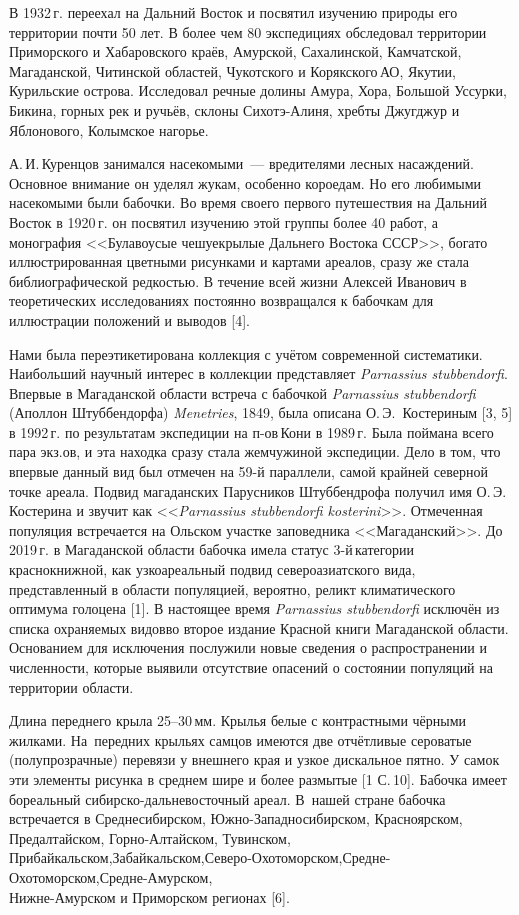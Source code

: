 В 1932\,г. переехал на Дальний Восток и посвятил изучению природы его территории почти 50 лет. В более чем 80 экспедициях обследовал территории Приморского и Хабаровского краёв, Амурской, Сахалинской, Камчатской, Магаданской, Читинской областей, Чукотского и Корякского\,АО, Якутии, Курильские острова. Исследовал речные долины Амура, Хора, Большой Уссурки, Бикина, горных рек и ручьёв, склоны Сихотэ-Алиня, хребты Джугджур и Яблонового, Колымское нагорье.

А.\,И.\,Куренцов занимался насекомыми~--- вредителями лесных насаждений. Основное внимание он уделял жукам, особенно короедам. Но его любимыми насекомыми были бабочки. Во время своего первого путешествия на Дальний Восток в 1920\,г. он посвятил изучению этой группы более 40 работ, а монография <<Булавоусые чешуекрылые Дальнего Востока СССР>>, богато иллюстрированная цветными рисунками и картами ареалов, сразу же стала библиографической редкостью. В течение всей жизни Алексей Иванович в теоретических исследованиях постоянно возвращался к бабочкам для иллюстрации положений и выводов [4].
\enlargethispage{\baselineskip}

Нами была переэтикетирована коллекция с учётом современной систематики. Наибольший научный интерес в коллекции представляет \textit{Parnassius stubbendorfi}. Впервые в Магаданской области встреча с бабочкой \textit{Parnassius stubbendorfi} (Аполлон Штуббендорфа) \textit{Menetries}, 1849, была описана О.\,Э.~Костериным [3, 5] в 1992\,г. по результатам экспедиции на п-ов\,Кони в 1989\,г. Была поймана всего пара экз.ов, и эта находка сразу стала жемчужиной экспедиции. Дело в том, что впервые данный вид был отмечен на 59-й параллели, самой крайней северной точке ареала. Подвид магаданских Парусников Штуббендрофа получил имя О.\,Э.\,Костерина и звучит как <<\textit{Parnassius stubbendorfi kosterini}>>. Отмеченная популяция встречается на Ольском участке заповедника <<Магаданский>>. До 2019\,г. в Магаданской области бабочка имела статус 3-й\,категории краснокнижной, как узкоареальный подвид североазиатского вида, представленный в области популяцией, вероятно, реликт климатического оптимума голоцена [1]. В настоящее время \textit{Parnassius stubbendorfi} исключён из списка охраняемых видов во второе издание Красной книги Магаданской области.\\Основанием для исключения послужили новые сведения о распространении и численности, которые выявили отсутствие опасений о состоянии популяций на территории области.

Длина переднего крыла 25--30\,мм. Крылья белые с контрастными чёрными жилками. На~передних крыльях самцов имеются две отчётливые сероватые (полупрозрачные) перевязи у внешнего края и узкое дискальное пятно. У самок эти элементы рисунка в среднем шире и более размытые [1 С.\,10]. Бабочка имеет бореальный сибирско-дальневосточный ареал. В~нашей стране бабочка встречается в Среднесибирском, Южно-Западносибирском, Красноярском, Предалтайском, Горно-Алтайском, Тувинском, Прибайкальском,\;\;Забайкальском,\;\;Северо-Охо\-то\-морс\-ком,\;\;\;Средне-Охотоморском,\;\;\;Средне-Амурском,\\Нижне-Амурском и Приморском регионах [6].

